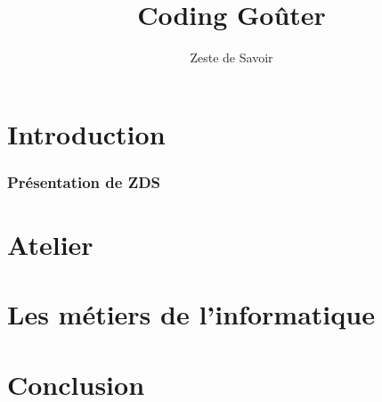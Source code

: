 \documentclass{beamer}
\title{Coding Goûter}
\author{Zeste de Savoir}
\begin{document}
\begin{frame}
  \titlepage
\end{frame}

\section{Introduction}

\begin{frame}
  \frametitle{Présentation de ZDS}
\end{frame}
\section{Atelier}

\section{Les métiers de l'informatique}

\section{Conclusion}
\end{document}
